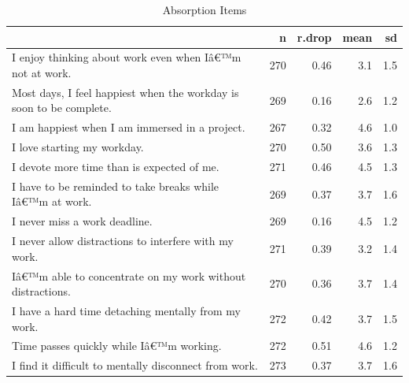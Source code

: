 \documentclass[
]{book}
\begin{document}
\begin{table}

\caption{\label{tab:rdrop4}Absorption Items}
\centering
\begin{tabular}[t]{l|r|r|r|r}
\hline
  & n & r.drop & mean & sd\\
\hline
I enjoy thinking about work even when Iâ€™m not at work. & 270 & 0.46 & 3.1 & 1.5\\
\hline
Most days, I feel happiest when the workday is soon to be complete. & 269 & 0.16 & 2.6 & 1.2\\
\hline
I am happiest when I am immersed in a project. & 267 & 0.32 & 4.6 & 1.0\\
\hline
I love starting my workday. & 270 & 0.50 & 3.6 & 1.3\\
\hline
I devote more time than is expected of me. & 271 & 0.46 & 4.5 & 1.3\\
\hline
I have to be reminded to take breaks while Iâ€™m at work. & 269 & 0.37 & 3.7 & 1.6\\
\hline
I never miss a work deadline. & 269 & 0.16 & 4.5 & 1.2\\
\hline
I never allow distractions to interfere with my work. & 271 & 0.39 & 3.2 & 1.4\\
\hline
Iâ€™m able to concentrate on my work without distractions. & 270 & 0.36 & 3.7 & 1.4\\
\hline
I have a hard time detaching mentally from my work. & 272 & 0.42 & 3.7 & 1.5\\
\hline
Time passes quickly while Iâ€™m working. & 272 & 0.51 & 4.6 & 1.2\\
\hline
I find it difficult to mentally disconnect from work. & 273 & 0.37 & 3.7 & 1.6\\
\hline
\end{tabular}
\end{table}
\end{document}

